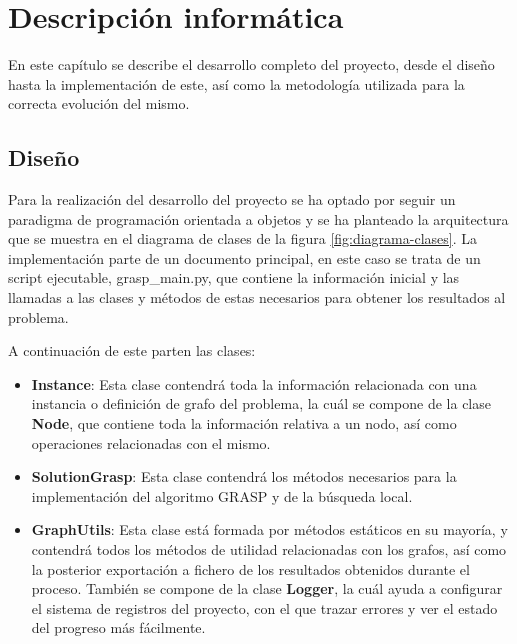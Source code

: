 
\chapter{Descripción informática} %

\label{Chapter4} %


En este capítulo se describe el desarrollo completo del proyecto, desde el diseño hasta la implementación de este, así como la metodología utilizada para la correcta evolución del mismo.

\section{Diseño}
Para la realización del desarrollo del proyecto se ha optado por seguir un paradigma de programación orientada a objetos y se ha planteado la arquitectura que se muestra en el diagrama de clases de la figura \ref{fig:diagrama-clases}.
La implementación parte de un documento principal, en este caso se trata de un script ejecutable, grasp\_main.py, que contiene la información inicial y las llamadas a las clases y métodos de estas necesarios para obtener los resultados al problema.

A continuación de este parten las clases:
 \begin{itemize}
	\item \textbf{Instance}: Esta clase contendrá toda la información relacionada con una instancia o definición de grafo del problema, la cuál se compone de la clase \textbf{Node}, que contiene toda la información relativa a un nodo, así como operaciones relacionadas con el mismo.
	\item \textbf{SolutionGrasp}: Esta clase contendrá los métodos necesarios para la implementación del algoritmo \gls{GRASP} y de la búsqueda local.
	\item \textbf{GraphUtils}: Esta clase está formada por métodos estáticos en su mayoría, y contendrá todos los métodos de utilidad relacionadas con los grafos, así como la posterior exportación a fichero de los resultados obtenidos durante el proceso. También se compone de la clase \textbf{Logger}, la cuál ayuda a configurar el sistema de registros del proyecto, con el que trazar errores y ver el estado del progreso más fácilmente.
\end{itemize}

